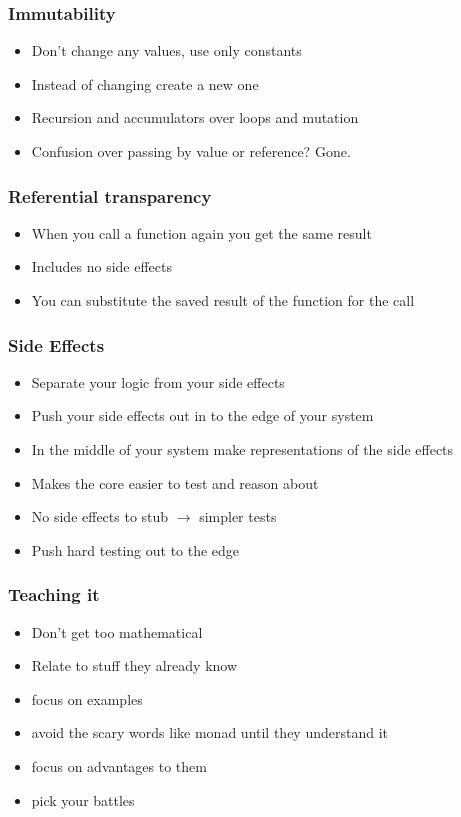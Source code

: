 \documentclass{beamer}
\begin{document}
\begin{frame}
\frametitle{Immutability}
\begin{itemize}
\item Don't change any values, use only constants
\item Instead of changing create a new one
\item Recursion and accumulators over loops and mutation
\item Confusion over passing by value or reference? Gone.
\end{itemize}
\end{frame}

\begin {frame}
\frametitle{Referential transparency}
\begin{itemize}
\item When you call a function again you get the same result
\item Includes no side effects
\item You can substitute the saved result of the function for the call
\end{itemize}
\end{frame}

\begin{frame}
\frametitle{Side Effects}
\begin{itemize}
\item Separate your logic from your side effects
\item Push your side effects out in to the edge of your system
\item In the middle of your system make representations of the side effects
\item Makes the core easier to test and reason about
\item No side effects to stub $\rightarrow$ simpler tests
\item Push hard testing out to the edge
\end{itemize}
\end{frame}

\begin{frame}
\frametitle{Teaching it}
\begin{itemize}
\item Don't get too mathematical
\item Relate to stuff they already know
\item focus on examples
\item avoid the scary words like monad until they understand it
\item focus on advantages to them
\item pick your battles
\end{itemize}
\end{frame}
\end{document}
